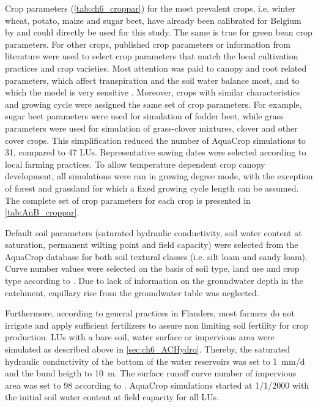 Crop parameters (\autoref{tab:ch6_croppar}) for the most prevalent crops, i.e. winter wheat, potato, maize and sugar beet, have already been calibrated for Belgium by \textcite{vanuytrecht2013,vanuytrecht2015, vanuytrecht2014} and could directly be used for this study. The same is true for green bean crop parameters. For other crops, published crop parameters or information from literature \parencite{abrha2012, allen1998, paredes2013, vanuytrecht2013} were used to select crop parameters that match the local cultivation practices and crop varieties. Most attention was paid to canopy and root related parameters, which affect transpiration and the soil water balance most, and to which the model is very sensitive \parencite{vanuytrecht2014b}. Moreover, crops with similar characteristics and growing cycle were assigned the same set of crop parameters. For example, sugar beet parameters were used for simulation of fodder beet, while grass parameters were used for simulation of grass-clover mixtures, clover and other cover crops. This simplification reduced the number of AquaCrop simulations to 31, compared to 47 LUs. Representative sowing dates were selected according to local farming practices. To allow temperature dependent crop canopy development, all simulations were ran in growing degree mode, with the exception of forest and grassland for which a fixed growing cycle length can be assumed. The complete set of crop parameters for each crop is presented in \autoref{tab:AnB_croppar}.

Default soil parameters (saturated hydraulic conductivity, soil water content at saturation, permanent wilting point and field capacity) were selected from the AquaCrop database for both soil textural classes (i.e. silt loam and sandy loam). Curve number values were selected on the basis of soil type, land use and crop type according to \textcite{usda2007}. Due to lack of information on the groundwater depth in the catchment, capillary rise from the groundwater table was neglected.

Furthermore, according to general practices in Flanders, most farmers do not irrigate and apply sufficient fertilizers to assure non limiting soil fertility for crop production. LUs with a bare soil, water surface or impervious area were simulated as described above in \autoref{sec:ch6_ACHydro}. Thereby, the saturated hydraulic conductivity of the bottom of the water reservoirs was set to \SI{1}{mm/d} and the bund heigth to \SI{10}{m}. The surface runoff curve number of impervious area was set to 98 according to \textcite{usda2007}. AquaCrop simulations started at 1/1/2000 with the initial soil water content at field capacity for all LUs.  



